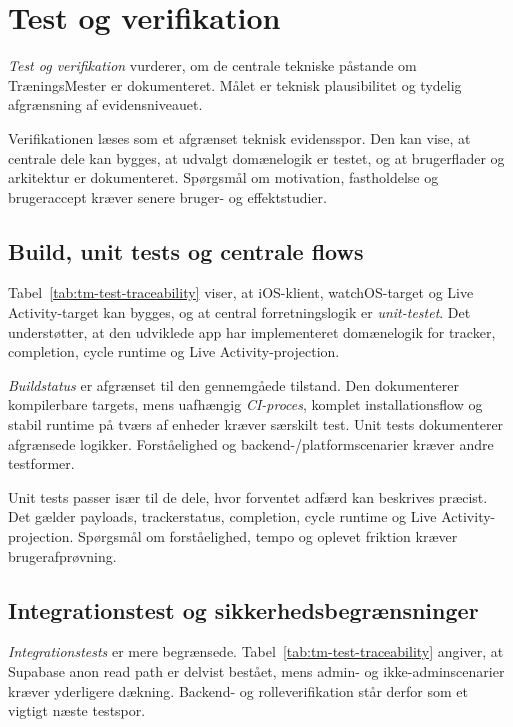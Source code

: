 \section{Test og verifikation}

\emph{Test og verifikation} vurderer, om de centrale tekniske påstande om TræningsMester er dokumenteret. Målet er teknisk plausibilitet og tydelig afgrænsning af evidensniveauet.

Verifikationen læses som et afgrænset teknisk evidensspor. Den kan vise, at centrale dele kan bygges, at udvalgt domænelogik er testet, og at brugerflader og arkitektur er dokumenteret. Spørgsmål om motivation, fastholdelse og brugeraccept kræver senere bruger- og effektstudier.

\subsection{Build, unit tests og centrale flows}

Tabel~\ref{tab:tm-test-traceability} viser, at iOS-klient, watchOS-target og Live Activity-target kan bygges, og at central forretningslogik er \emph{unit-testet}. Det understøtter, at den udviklede app har implementeret domænelogik for tracker, completion, cycle runtime og Live Activity-projection.

\emph{Buildstatus} er afgrænset til den gennemgåede tilstand. Den dokumenterer kompilerbare targets, mens uafhængig \emph{CI-proces}, komplet installationsflow og stabil runtime på tværs af enheder kræver særskilt test. Unit tests dokumenterer afgrænsede logikker. Forståelighed og backend-/platformscenarier kræver andre testformer.

Unit tests passer især til de dele, hvor forventet adfærd kan beskrives præcist. Det gælder payloads, trackerstatus, completion, cycle runtime og Live Activity-projection. Spørgsmål om forståelighed, tempo og oplevet friktion kræver brugerafprøvning.

\subsection{Integrationstest og sikkerhedsbegrænsninger}

\emph{Integrationstests} er mere begrænsede. Tabel~\ref{tab:tm-test-traceability} angiver, at Supabase anon read path er delvist bestået, mens admin- og ikke-adminscenarier kræver yderligere dækning. Backend- og rolleverifikation står derfor som et vigtigt næste testspor.

